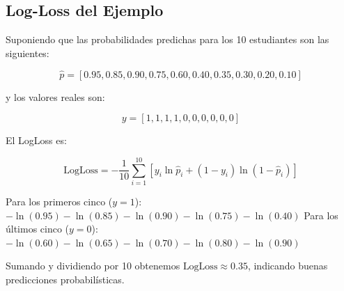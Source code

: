 \documentclass[12pt]{article}
\begin{document}
\subsection{Log-Loss del Ejemplo}

Suponiendo que las probabilidades predichas para los 10 estudiantes son las siguientes:

\[
\hat{p} = [0.95, 0.85, 0.90, 0.75, 0.60, 0.40, 0.35, 0.30, 0.20, 0.10]
\]

y los valores reales son:

\[
y = [1, 1, 1, 1, 0, 0, 0, 0, 0, 0]
\]

El LogLoss es:

\[
\text{LogLoss} = -\frac{1}{10} \sum_{i=1}^{10} [y_i \ln \hat{p}_i + (1-y_i)\ln(1-\hat{p}_i)]
\]

Para los primeros cinco ($y=1$): $-\ln(0.95) - \ln(0.85) - \ln(0.90) - \ln(0.75) - \ln(0.40)$
Para los últimos cinco ($y=0$): $-\ln(0.60) - \ln(0.65) - \ln(0.70) - \ln(0.80) - \ln(0.90)$

Sumando y dividiendo por 10 obtenemos $\text{LogLoss} \approx 0.35$, indicando buenas predicciones probabilísticas.

\end{document}
